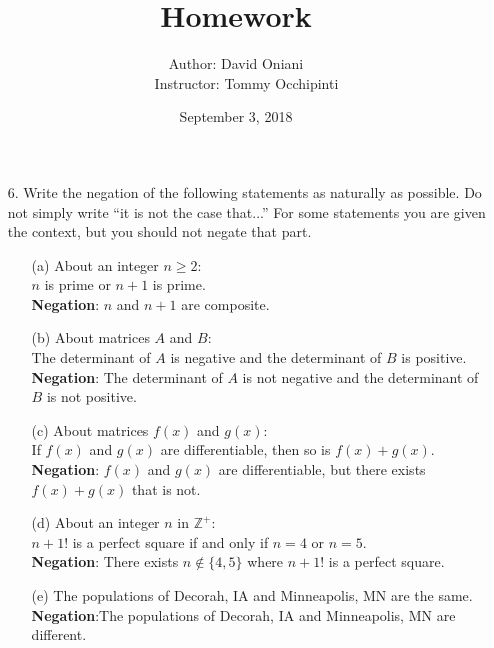 \documentclass[12pt, a4paper]{article}                  %
\title{\bf{Homework \textnumero 2}}
\author{Author: David Oniani
\\
\ \ \ Instructor: Tommy Occhipinti}
\date{September 3, 2018}
\begin{document}
\maketitle

\begin{enumerate}
\item[6.]
Write the negation of the following statements as naturally as possible. Do not simply
write “it is not the case that...” For some statements you are given the context, but
you should not negate that part.
\begin{enumerate}
\item[(a)]
About an integer $n \geq 2$:\\
$n$ is prime or $n+1$ is prime.\\
\textbf{Negation}: $n$ and $n+1$ are composite.

\item[(b)]
About matrices $A$ and $B$:\\
The determinant of $A$ is negative and the determinant of $B$ is positive.\\
\textbf{Negation}: The determinant of $A$ is not negative and the determinant of $B$ is not positive.

\item[(c)]
About matrices $f(x)$ and $g(x)$:\\
If $f(x)$ and $g(x)$ are differentiable, then so is $f(x) + g(x)$.\\
\textbf{Negation}: $f(x)$ and $g(x)$ are differentiable, but there exists $f(x) + g(x)$ that is not.

\item[(d)]
About an integer $n$ in $\mathbb{Z}^+$:\\
$n+1!$ is a perfect square if and only if $n=4$ or $n=5$.\\
\textbf{Negation}: There exists $n \notin \{4,5\}$ where $n+1!$ is a perfect square.

\item[(e)]
The populations of Decorah, IA and Minneapolis, MN are the same.\\
\textbf{Negation}:The populations of Decorah, IA and Minneapolis, MN are different.
\end{enumerate}


\end{enumerate}
\end{document}
